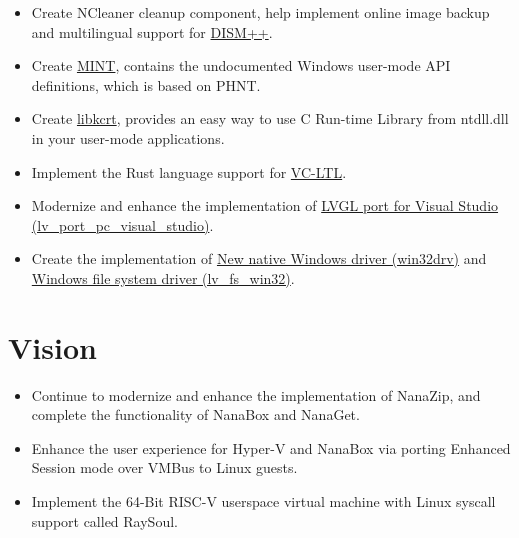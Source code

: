 \documentclass{resume}
\begin{document}
\begin{itemize}
  \item Create NCleaner cleanup component, help implement online image backup and multilingual support for \href{https://github.com/Chuyu-Team/Dism-Multi-language/releases/latest}{DISM++}.
  \item Create \href{https://github.com/Chuyu-Team/MINT}{MINT}, contains the undocumented Windows user-mode API definitions, which is based on PHNT.
  \item Create \href{https://github.com/Chuyu-Team/libkcrt}{libkcrt}, provides an easy way to use C Run-time Library from ntdll.dll in your user-mode applications.
  \item Implement the Rust language support for \href{https://github.com/Chuyu-Team/VC-LTL5}{VC-LTL}.
\end{itemize}

\begin{itemize}
  \item Modernize and enhance the implementation of \href{https://github.com/lvgl/lv_port_pc_visual_studio}{LVGL port for Visual Studio (lv\_port\_pc\_visual\_studio)}.
  \item Create the implementation of \href{https://github.com/lvgl/lv_drivers/pull/117}{New native Windows driver (win32drv)} and \href{https://github.com/lvgl/lvgl/pull/2701}{Windows file system driver (lv\_fs\_win32)}.
\end{itemize}

\section{Vision}
\begin{itemize}

  \item Continue to modernize and enhance the implementation of NanaZip, and complete the functionality of NanaBox and NanaGet.
  
  \item Enhance the user experience for Hyper-V and NanaBox via porting Enhanced Session mode over VMBus to Linux guests.
  
  \item Implement the 64-Bit RISC-V userspace virtual machine with Linux syscall support called RaySoul.
  
\end{itemize}
\end{document}
